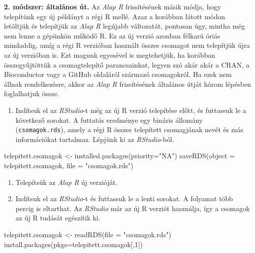 \documentclass[
]{book}
\newenvironment{Shaded}{\begin{snugshade}}{\end{snugshade}}
\newcommand{\AttributeTok}[1]{\textcolor[rgb]{0.77,0.63,0.00}{#1}}
\newcommand{\DecValTok}[1]{\textcolor[rgb]{0.00,0.00,0.81}{#1}}
\newcommand{\FunctionTok}[1]{\textcolor[rgb]{0.00,0.00,0.00}{#1}}
\newcommand{\NormalTok}[1]{#1}
\newcommand{\OtherTok}[1]{\textcolor[rgb]{0.56,0.35,0.01}{#1}}
\newcommand{\StringTok}[1]{\textcolor[rgb]{0.31,0.60,0.02}{#1}}
\providecommand{\tightlist}{%
  \setlength{\itemsep}{0pt}\setlength{\parskip}{0pt}}
\begin{document}
\textbf{2. módszer: általános út.} Az \emph{Alap R} frissítésének másik módja, hogy telepítünk egy új példányt a régi R mellé. Azaz a korábban látott módon letöltjük és telepítjük az \emph{Alap R} legújabb változatát, pontosan úgy, mintha még nem lenne a gépünkön működő R. Ez az új verzió azonban félkarú óriás mindaddig, amíg a régi R verzióban használt összes csomagot nem telepítjük újra az új verzióban is. Ezt magunk egyesével is megtehetjük, ha korábban összegyűjtöttük a csomagtelepítő parancsainkat, legyen szó akár akár a CRAN, a Bioconductor vagy a GitHub oldaláról származó csomagokról. Ha ezek nem állnak rendelkezésre, akkor az \emph{Alap R} frissítésének általános útját három lépésben foglalhatjuk össze.

\begin{enumerate}
\def\labelenumi{\arabic{enumi}.}
\tightlist
\item
  Indítsuk el az \emph{RStudio}-t még az új R verzió telepítése előtt, és futtassuk le a következő sorokat. A futtatás eredménye egy bináris állomány (\texttt{csomagok.rds}), amely a régi R összes telepített csomagjának nevét és más információkat tartalmaz. Lépjünk ki az \emph{RStudio}-ból.
\end{enumerate}

\begin{Shaded}
\begin{Highlighting}[]
\NormalTok{telepitett.csomagok }\OtherTok{\textless{}{-}} \FunctionTok{installed.packages}\NormalTok{(}\AttributeTok{priority=}\StringTok{"NA"}\NormalTok{)}
\FunctionTok{saveRDS}\NormalTok{(}\AttributeTok{object =}\NormalTok{ telepitett.csomagok, }\AttributeTok{file =} \StringTok{"csomagok.rds"}\NormalTok{)}
\end{Highlighting}
\end{Shaded}

\begin{enumerate}
\def\labelenumi{\arabic{enumi}.}
\setcounter{enumi}{1}
\item
  Telepítsük az \emph{Alap R} új verzióját.
\item
  Indítsuk el az \emph{RStudio}-t és futtassuk le a lenti sorokat. A folyamat több percig is eltarthat. Az \emph{RStudio} már az új R verziót használja, így a csomagok az új R tudását egészítik ki.
\end{enumerate}

\begin{Shaded}
\begin{Highlighting}[]
\NormalTok{telepitett.csomagok }\OtherTok{\textless{}{-}} \FunctionTok{readRDS}\NormalTok{(}\AttributeTok{file =} \StringTok{"csomagok.rds"}\NormalTok{)}
\FunctionTok{install.packages}\NormalTok{(}\AttributeTok{pkgs=}\NormalTok{telepitett.csomagok[,}\DecValTok{1}\NormalTok{])}
\end{Highlighting}
\end{Shaded}
\end{document}
